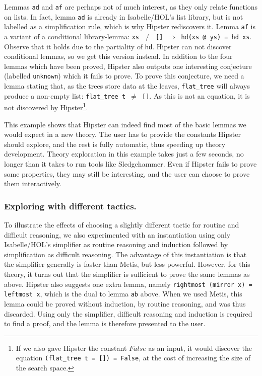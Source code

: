 Lemmas \texttt{ad} and \texttt{af} are perhaps not of much interest, as they only relate functions on lists. In fact, lemma \texttt{ad} is already in Isabelle/HOL's list library, but is not labelled as a simplification rule, which is why Hipster rediscovers it. Lemma \texttt{af} is a variant of a conditional library-lemma: \texttt{xs $\neq$ [] $\Longrightarrow$ hd(xs @ ys) = hd xs}. Observe that it holds due to the partiality of \texttt{hd}. Hipster can not discover conditional lemmas, so we get this version instead. In addition to the four lemmas which have been proved, Hipster also outputs one interesting conjecture (labelled \texttt{unknown}) which it fails to prove. To prove this conjecture, we need a lemma stating that, as the trees store data at the leaves, \texttt{flat\_tree} will always produce a non-empty list: 
 \texttt{flat\_tree t $\neq$ []}. As this is not an equation, it is not discovered by Hipster\footnote{If we also gave Hipster the
   constant $False$ as an input, it would discover the equation
  \texttt{(flat\_tree t = []) = False}, at the cost of increasing
  the size of the search space.}. 
 
This example shows that Hipster can indeed find most of the basic lemmas we would expect in a new theory. The user has to provide the constants Hipster should explore, and the rest is fully automatic, thus speeding up theory development.  Theory exploration in this example takes just a few seconds, no longer than it takes to run tools like Sledgehammer. Even if Hipster fails to prove some properties, they may still be interesting, and the user can choose to prove them interactively.

\subsubsection*{Exploring with different tactics.}
To illustrate the effects of choosing a slightly different tactic for routine and difficult reasoning, we also experimented with an instantiation using only Isabelle/HOL's simplifier as routine reasoning and induction followed by simplification as difficult reasoning. The advantage of this instantiation is that the simplifier generally is faster than Metis, but less powerful. However, for this theory, it turns out that the simplifier is sufficient to prove the same lemmas as above. Hipster also suggests one extra lemma, namely \texttt{rightmost (mirror x) = leftmost x}, which is the dual to lemma \texttt{ab} above. When we used Metis, this lemma could be proved without induction, by routine reasoning, and was thus discarded. Using only the simplifier, difficult reasoning and induction is required to find a proof, and the lemma is therefore presented to the user. 

